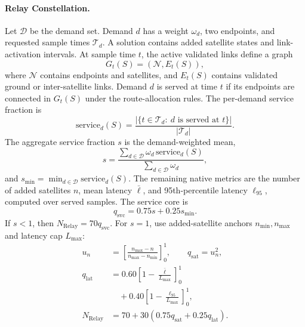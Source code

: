 \documentclass[11pt]{article}
\begin{document}
\paragraph{Relay Constellation.} Let \(\mathcal{D}\) be the demand set. Demand \(d\) has a weight \(\omega_d\), two endpoints, and requested sample times \(\mathcal{T}_d\). A solution contains added satellite states and link-activation intervals. At sample time \(t\), the active validated links define a graph
\[
  G_t(S)=(\mathcal{N},E_t(S)),
\]
where \(\mathcal{N}\) contains endpoints and satellites, and \(E_t(S)\) contains validated ground or inter-satellite links. Demand \(d\) is served at time \(t\) if its endpoints are connected in \(G_t(S)\) under the route-allocation rules. The per-demand service fraction is
\[
  \mathrm{service}_d(S)=
  \frac{|\{t\in\mathcal{T}_d:\ d\text{ is served at }t\}|}{|\mathcal{T}_d|}.
\]
The aggregate service fraction \(s\) is the demand-weighted mean,
\[
  s=\frac{\sum_{d\in\mathcal{D}}\omega_d\,\mathrm{service}_d(S)}{\sum_{d\in\mathcal{D}}\omega_d},
\]
and \(s_{\min}=\min_{d\in\mathcal{D}}\mathrm{service}_d(S)\). The remaining native metrics are the number of added satellites \(n\), mean latency \(\bar{\ell}\), and 95th-percentile latency \(\ell_{95}\), computed over served samples. The service core is
\[
  q_{\mathrm{svc}}=0.75s+0.25s_{\min}.
\]
If \(s<1\), then \(N_{\mathrm{Relay}}=70q_{\mathrm{svc}}\). For \(s=1\), use added-satellite anchors \(n_{\min},n_{\max}\) and latency cap \(L_{\max}\):
\[
  \begin{aligned}
  u_n&=\left[\frac{n_{\max}-n}{n_{\max}-n_{\min}}\right]_0^1,
  \qquad q_{\mathrm{sat}}=u_n^2,\\
  q_{\mathrm{lat}}&=0.60\left[1-\frac{\bar{\ell}}{L_{\max}}\right]_0^1\\
  &\quad+0.40\left[1-\frac{\ell_{95}}{L_{\max}}\right]_0^1,\\
  N_{\mathrm{Relay}}&=70+30(0.75q_{\mathrm{sat}}+0.25q_{\mathrm{lat}}).
  \end{aligned}
\]
\end{document}
